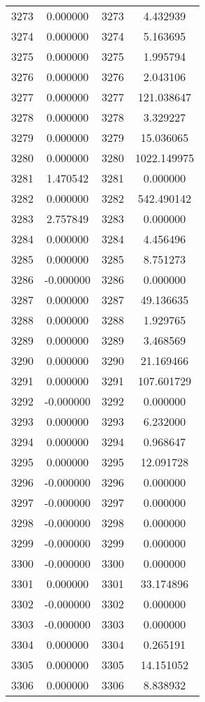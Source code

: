 \documentclass[12pt]{article}
\begin{document}
\begin{longtable}{@{}cccc@{}}
3273 & 0.000000 & 3273 & 4.432939 \\
3274 & 0.000000 & 3274 & 5.163695 \\
3275 & 0.000000 & 3275 & 1.995794 \\
3276 & 0.000000 & 3276 & 2.043106 \\
3277 & 0.000000 & 3277 & 121.038647 \\
3278 & 0.000000 & 3278 & 3.329227 \\
3279 & 0.000000 & 3279 & 15.036065 \\
3280 & 0.000000 & 3280 & 1022.149975 \\
3281 & 1.470542 & 3281 & 0.000000 \\
3282 & 0.000000 & 3282 & 542.490142 \\
3283 & 2.757849 & 3283 & 0.000000 \\
3284 & 0.000000 & 3284 & 4.456496 \\
3285 & 0.000000 & 3285 & 8.751273 \\
3286 & -0.000000 & 3286 & 0.000000 \\
3287 & 0.000000 & 3287 & 49.136635 \\
3288 & 0.000000 & 3288 & 1.929765 \\
3289 & 0.000000 & 3289 & 3.468569 \\
3290 & 0.000000 & 3290 & 21.169466 \\
3291 & 0.000000 & 3291 & 107.601729 \\
3292 & -0.000000 & 3292 & 0.000000 \\
3293 & 0.000000 & 3293 & 6.232000 \\
3294 & 0.000000 & 3294 & 0.968647 \\
3295 & 0.000000 & 3295 & 12.091728 \\
3296 & -0.000000 & 3296 & 0.000000 \\
3297 & -0.000000 & 3297 & 0.000000 \\
3298 & -0.000000 & 3298 & 0.000000 \\
3299 & -0.000000 & 3299 & 0.000000 \\
3300 & -0.000000 & 3300 & 0.000000 \\
3301 & 0.000000 & 3301 & 33.174896 \\
3302 & -0.000000 & 3302 & 0.000000 \\
3303 & -0.000000 & 3303 & 0.000000 \\
3304 & 0.000000 & 3304 & 0.265191 \\
3305 & 0.000000 & 3305 & 14.151052 \\
3306 & 0.000000 & 3306 & 8.838932 \\

\end{longtable}
\end{document}
